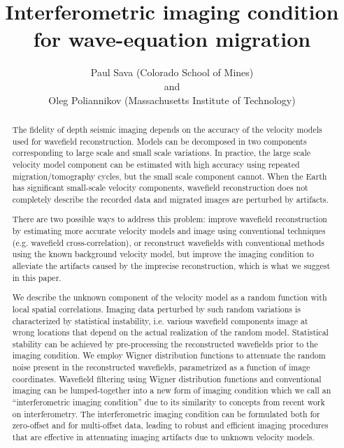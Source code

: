 

\title{Interferometric imaging condition for wave-equation migration}
\author{
Paul Sava (Colorado School of Mines) 
\\ and \\
Oleg Poliannikov (Massachusetts Institute of Technology)
}

\maketitle

\begin{abstract}
The fidelity of depth seismic imaging depends on the accuracy of the
velocity models used for wavefield reconstruction. Models can be
decomposed in two components corresponding to large scale and small
scale variations. In practice, the large scale velocity model
component can be estimated with high accuracy using repeated
migration/tomography cycles, but the small scale component
cannot. When the Earth has significant small-scale velocity
components, wavefield reconstruction does not completely describe the
recorded data and migrated images are perturbed by artifacts.

There are two possible ways to address this problem: improve wavefield
reconstruction by estimating more accurate velocity models and image
using conventional techniques (e.g. wavefield cross-correlation), or
reconstruct wavefields with conventional methods using the known
background velocity model, but improve the imaging condition to
alleviate the artifacts caused by the imprecise reconstruction, which
is what we suggest in this paper.

We describe the unknown component of the velocity model as a random
function with local spatial correlations. Imaging data perturbed by
such random variations is characterized by statistical instability,
i.e. various wavefield components image at wrong locations that depend
on the actual realization of the random model. Statistical stability
can be achieved by pre-processing the reconstructed wavefields prior
to the imaging condition. We employ Wigner distribution functions to
attenuate the random noise present in the reconstructed wavefields,
parametrized as a function of image coordinates. Wavefield filtering
using Wigner distribution functions and conventional imaging can be
lumped-together into a new form of imaging condition which we call an
``interferometric imaging condition'' due to its similarity to
concepts from recent work on interferometry. The interferometric
imaging condition can be formulated both for zero-offset and for
multi-offset data, leading to robust and efficient imaging procedures
that are effective in attenuating imaging artifacts due to unknown
velocity models.
\end{abstract}

